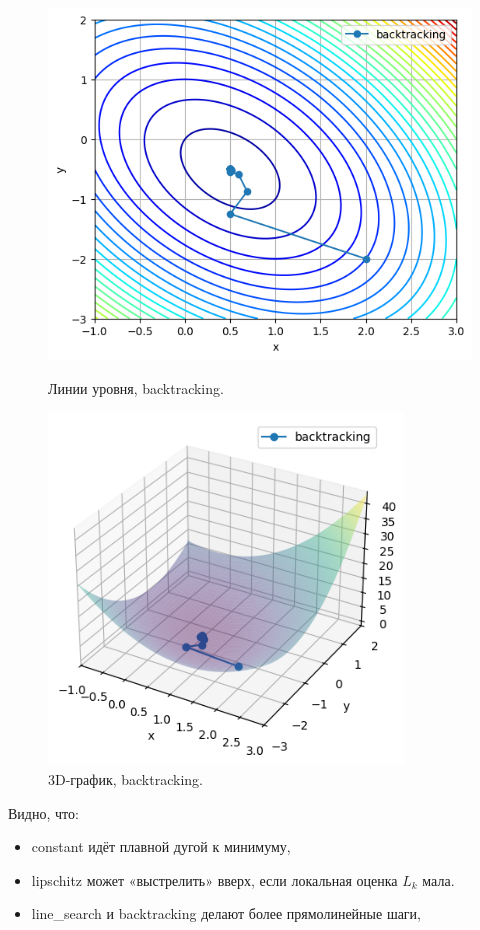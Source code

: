 \documentclass[a4paper,12pt]{article}
\begin{document}
\begin{figure}[H]
    \begin{minipage}{0.49\textwidth}
        \centering \includegraphics[width=\textwidth]{images/task2/plot_levels_2_2_backtracking.png}
        \caption{Линии уровня, backtracking.}
    \end{minipage}\hfill
    \begin{minipage}{0.49\textwidth}
        \centering \includegraphics[width=0.84\textwidth]{images/task2/plot_3d_2_2_backtracking.png}
        \caption{3D-график, backtracking.}
    \end{minipage}
\end{figure}
\noindent
Видно, что:
\begin{itemize}
    \item constant идёт плавной дугой к минимуму, 
    \item lipschitz может «выстрелить» вверх, если локальная оценка $L_k$ мала.
    \item line\_search и backtracking делают более прямолинейные шаги,
\end{itemize}
\end{document}

